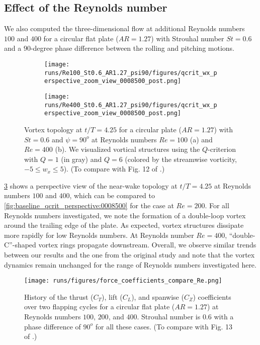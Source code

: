 \subsection{Effect of the Reynolds number}

We also computed the three-dimensional flow at additional Reynolds numbers $100$ and $400$ for a circular flat plate ($AR = 1.27$) with Strouhal number $St = 0.6$ and a $90$-degree phase difference between the rolling and pitching motions.

\begin{figure}
  \centering
  \begin{subfigure}[c]{0.45\textwidth}
    \centering
    \texttt{[image: runs/Re100\_St0.6\_AR1.27\_psi90/figures/qcrit\_wx\_perspective\_zoom\_view\_0008500\_post.png]}
    \caption{}
    \label{fig:reynolds_wake_topology:100_perspective}
  \end{subfigure}
  \hfill
  \begin{subfigure}[c]{0.45\textwidth}
    \centering
    \texttt{[image: runs/Re400\_St0.6\_AR1.27\_psi90/figures/qcrit\_wx\_perspective\_zoom\_view\_0008500\_post.png]}
    \caption{}
    \label{fig:reynolds_wake_topology:400_perspective}
  \end{subfigure}
  \caption{Vortex topology at $t / T = 4.25$ for a circular plate ($AR = 1.27$) with $St = 0.6$ and $\psi = 90^o$ at Reynolds numbers $Re = 100$ (a) and $Re = 400$ (b). We visualized vortical structures using the $Q$-criterion with $Q = 1$ (in gray) and $Q = 6$ (colored by the streamwise vorticity, $-5 \leq w_x \leq 5$). (To compare with Fig. 12 of \citet{li_dong_2016}.)}
  \label{fig:reynolds_wake_topology}
\end{figure}

\cref{fig:reynolds_wake_topology} shows a perspective view of the near-wake topology at $t/T = 4.25$ at Reynolds numbers $100$ and $400$, which can be compared to \cref{fig:baseline_qcrit_perspective:0008500} for the case at $Re = 200$.
For all Reynolds numbers investigated, we note the formation of a double-loop vortex around the trailing edge of the plate.
As expected, vortex structures dissipate more rapidly for low Reynolds numbers.
At Reynolds number $Re = 400$, ``double-C''-shaped vortex rings propagate downstream.
Overall, we observe similar trends between our results and the one from the original study and note that the vortex dynamics remain unchanged for the range of Reynolds numbers investigated here.

\begin{figure}
  \centering
  \texttt{[image: runs/figures/force\_coefficients\_compare\_Re.png]}
  \caption{History of the thrust ($C_T$), lift ($C_L$), and spanwise ($C_Z$) coefficients over two flapping cycles for a circular flat plate ($AR = 1.27$) at Reynolds numbers $100$, $200$, and $400$. Strouhal number is $0.6$ with a phase difference of $90^o$ for all these cases. (To compare with Fig. 13 of \citet{li_dong_2016}.)}
  \label{fig:reynolds_force_coefficients}
\end{figure}

